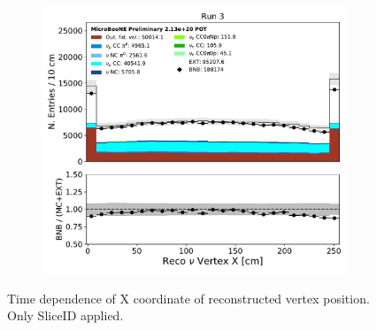 \begin{figure}[hbt!]
\begin{center}
\begin{subfigure}[b]{0.35\textwidth}
    \end{subfigure}
    \begin{subfigure}[b]{0.35\textwidth}
        \centering
        \includegraphics[width=1.00\textwidth]{NuMuCCsel/Images/Ryan/Run3_nocrt/reco_nu_vtx_sce_x_08062020_samples_longest_noCRT_event_category.pdf}
    \end{subfigure} %
\caption{Time dependence of X coordinate of reconstructed vertex position. Only SliceID applied.}
\label{fig:NuMuCCsel:timedep:vtxX}
\end{center}
\end{figure}

